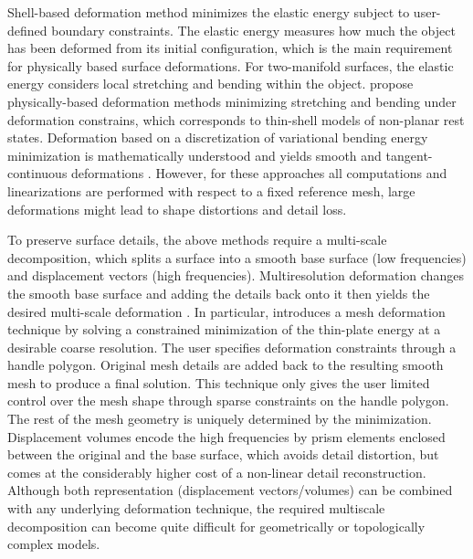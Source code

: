 Shell-based deformation method minimizes the elastic energy subject to user-defined boundary constraints. The elastic energy measures how much the object has been deformed from its initial configuration, which is the main requirement for physically based surface deformations. For two-manifold surfaces, the elastic energy considers local stretching and bending within the object. \cite{terzopoulos1987elastically,celniker1991deformable} propose physically-based deformation methods minimizing stretching and bending under deformation constrains, which corresponds to thin-shell models of non-planar rest states. Deformation based on a discretization of variational bending energy minimization is mathematically understood and yields smooth and tangent-continuous deformations \citep{guskov1999multiresolution,kobbelt1998interactive,botsch2004intuitive,bickel2008pose}. However, for these approaches all computations and linearizations are performed with respect to a fixed reference mesh, large deformations might lead to shape distortions and detail loss.

To preserve surface details, the above methods require a multi-scale decomposition, which splits a surface into a smooth base surface (low frequencies) and displacement vectors (high frequencies). Multiresolution deformation changes the smooth base surface and adding the details back onto it then yields the desired multi-scale deformation \citep{kobbelt1999multiresolution}. In particular, \cite{kobbelt1998interactive} introduces a mesh deformation technique by solving a constrained minimization of the thin-plate energy at a desirable coarse resolution. The user specifies deformation constraints through a handle polygon. Original mesh details are added back to the resulting smooth mesh to produce a final solution. This technique only gives the user limited control over the mesh shape through sparse constraints on the handle polygon. The rest of the mesh geometry is uniquely determined by the minimization. Displacement volumes \citep{botsch2003multiresolution} encode the high frequencies by prism elements enclosed between the original and the base surface, which avoids detail distortion, but comes at the considerably higher cost of a non-linear detail reconstruction. Although both representation (displacement vectors/volumes) can be combined with any underlying deformation technique, the required multiscale decomposition can become quite difficult for geometrically or topologically complex models.

